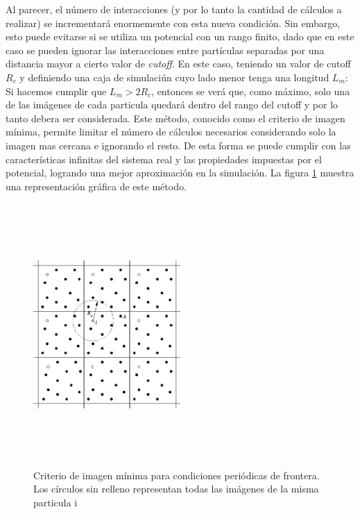 Al parecer, el número de interacciones (y por lo tanto la cantidad de cálculos a realizar) se incrementará enormemente con esta nueva condición. 
Sin embargo, esto puede evitarse si se utiliza un potencial con un rango finito, dado que en este caso se pueden ignorar las interacciones entre partículas separadas por una distancia mayor a cierto valor de \textit{cutoff}.
En este caso, teniendo un valor de cutoff $R_{c}$ y definiendo una caja de simulaciún cuyo lado menor tenga una longitud $L_m$: 
Si hacemos cumplir que $L_m>2R_{c}$, entonces se verá que, como máximo, solo una de las imágenes de cada particula quedará dentro del rango del cutoff y por lo tanto debera ser considerada.
Este método, conocido como el criterio de imagen mínima, permite limitar el número de cálculos necesarios considerando solo la imagen mas cercana e ignorando el resto. 
De esta forma se puede cumplir con las características infinitas del sistema real y las propiedades impuestas por el potencial, logrando una mejor aproximación en la simulación.
La figura \ref{minimage} muestra una representación gráfica de este método. 


\begin{figure}[!ht]
\centering
\includegraphics[keepaspectratio, height=10cm ,width=0.5\textwidth]{img/md/minimage.png}
\caption{Criterio de imagen mínima para condiciones periódicas de frontera. Los círculos sin relleno representan todas las imágenes de la misma particula i}
\label{minimage}
\end{figure}












